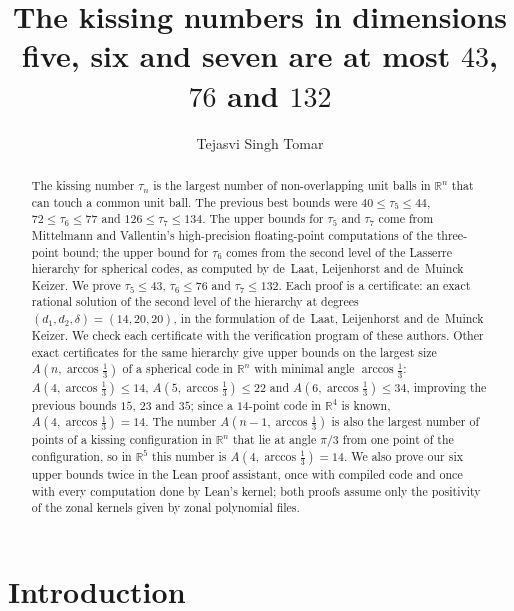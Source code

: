 \documentclass[11pt]{amsart}
\title{The kissing numbers in dimensions five, six and seven are at most $43$, $76$ and $132$}
\author{Tejasvi Singh Tomar}
\date{}
\theoremstyle{remark}
\newcommand{\R}{\mathbb{R}}
\begin{document}
\begin{abstract}
The kissing number $\tau_n$ is the largest number of non-overlapping unit balls in $\R^n$ that can touch a common unit ball. The previous best bounds were $40\le\tau_5\le44$, $72\le\tau_6\le77$ and $126\le\tau_7\le134$. The upper bounds for $\tau_5$ and $\tau_7$ come from Mittelmann and Vallentin's high-precision floating-point computations of the three-point bound; the upper bound for $\tau_6$ comes from the second level of the Lasserre hierarchy for spherical codes, as computed by de~Laat, Leijenhorst and de~Muinck Keizer. We prove $\tau_5\le 43$, $\tau_6\le76$ and $\tau_7\le132$. Each proof is a certificate: an exact rational solution of the second level of the hierarchy at degrees $(d_1,d_2,\delta)=(14,20,20)$, in the formulation of de~Laat, Leijenhorst and de~Muinck Keizer. We check each certificate with the verification program of these authors. Other exact certificates for the same hierarchy give upper bounds on the largest size $A(n,\arccos\frac13)$ of a spherical code in $\R^n$ with minimal angle $\arccos\frac13$: $A(4,\arccos\frac13)\le14$, $A(5,\arccos\frac13)\le22$ and $A(6,\arccos\frac13)\le34$, improving the previous bounds $15$, $23$ and $35$; since a $14$-point code in $\R^4$ is known, $A(4,\arccos\frac13)=14$. The number $A(n-1,\arccos\frac13)$ is also the largest number of points of a kissing configuration in $\R^n$ that lie at angle $\pi/3$ from one point of the configuration, so in $\R^5$ this number is $A(4,\arccos\frac13)=14$. We also prove our six upper bounds twice in the Lean proof assistant, once with compiled code and once with every computation done by Lean's kernel; both proofs assume only the positivity of the zonal kernels given by zonal polynomial files.
\end{abstract}
\maketitle

\section{Introduction}\label{sec:intro}
\end{document}
